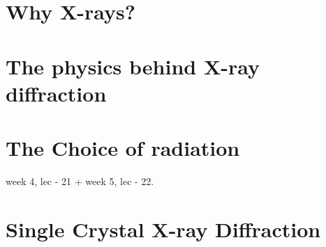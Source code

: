 \documentclass[11pt,a4paper]{article}
\begin{document}
	\section{Why X-rays?}
	
		
	
	
	
	
	\section{The physics behind X-ray diffraction}
	
	\section{The Choice of radiation}
	
	week 4, lec - 21 + week 5, lec - 22.
	
	
	
	\section{Single Crystal X-ray Diffraction}
	
	
	
	

	
	
	
	
	
	
	
		
\end{document}
